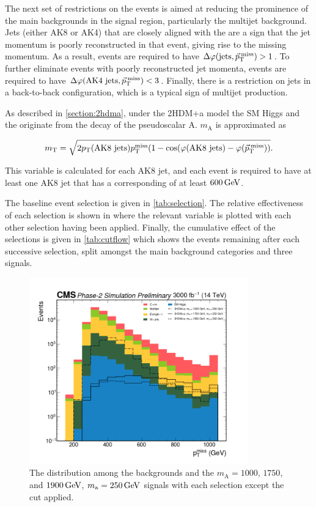 The next set of restrictions on the events is aimed at reducing the prominence of the main backgrounds in the signal region, particularly the multijet background. Jets (either AK8 or AK4) that are closely aligned with the \ptmiss are a sign that the jet momentum is poorly reconstructed in that event, giving rise to the missing momentum. As a result, events are required to have $\Delta\varphi(\text{jets}, \vec{p}_\mathrm{T}^{\kern2pt\text{miss}}) > 1$. To further eliminate events with poorly reconstructed jet momenta, events are required to have $\Delta\varphi(\text{AK4 jets}, \vec{p}_\mathrm{T}^{\kern2pt\text{miss}}) < 3$. Finally, there is a restriction on jets in a back-to-back configuration, which is a typical sign of multijet production.

As described in \cref{section:2hdma}, under the 2HDM+a model the SM Higgs and the \ptmiss originate from the decay of the pseudoscalar A. $m_\mathrm{A}$ is approximated as

\begin{equation}
    m_\mathrm{T} = \sqrt{2p_\mathrm{T}(\text{AK8 jets})p_\mathrm{T}^\text{miss}(1-\cos(\varphi(\text{AK8 jets})-\varphi(\vec{p}_\mathrm{T}^{\kern2pt\text{miss}}))}.
    \label{eq:mt}
\end{equation}

This variable is calculated for each AK8 jet, and each event is required to have at least one AK8 jet that has a corresponding \mt of at least $\GeV{600}$.

The baseline event selection is given in \cref{tab:selection}. The relative effectiveness of each selection is shown in  where the relevant variable is plotted with each other selection having been applied. Finally, the cumulative effect of the selections is given in \cref{tab:cutflow} which shows the events remaining after each successive selection, split amongst the main background categories and three signals.



\begin{figure}[ht]
\centering
\includegraphics[width=0.845\textwidth]{Chapters/Strategy/selections/met_pt.png}
\caption{The \ptmiss distribution among the backgrounds and the $m_\mathrm{A} =1000$, $1750$, and 
$\GeV{1900}$, $m_\mathrm{a} = \GeV{250}$ signals with each selection except the \ptmiss cut applied.}
\label{fig:metpt}
\end{figure}

